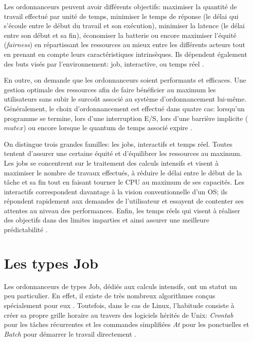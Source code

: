 \documentclass[letterpaper]{article}
\begin{document}
Les ordonnanceurs peuvent avoir différents objectifs: maximiser la quantité de travail effectué par unité de temps, minimiser le temps de réponse (le délai qui s'écoule entre le début du travail et son exécution), minimiser la latence (le délai entre son début et sa fin), économiser la batterie ou encore maximiser l'équité (\textit{fairness}) en répartissant les ressources au mieux entre les différents acteurs tout en prenant en compte leurs caractéristiques intrinsèques.
Ils dépendent également des buts visés par l'environnement: job, interactive, ou temps réel \citep{Hansen:1973:OSP:540365}.

En outre, on demande que les ordonnanceurs soient performants et efficaces. Une gestion optimale des ressources afin de faire bénéficier au maximum les utilisateurs sans subir le surcoût associé au système d'ordonnancement lui-même. Généralement, le choix d'ordonnancement est effectué dans quatre cas: lorsqu'un programme se termine, lors d'une interruption E/S, lors d'une barrière implicite ($mutex$) ou encore lorsque le quantum de temps associé expire \citep{Bovet:2005:ULK:1077084}.

On distingue trois grandes familles: les jobs, interactifs et temps réel. Toutes tentent d'assurer une certaine équité et d'équilibrer les ressources au maximum. Les jobs se concentrent sur le traitement des calculs intensifs et visent à maximiser le nombre de travaux effectués, à réduire le délai entre le début de la tâche et sa fin tout en faisant tourner le CPU au maximum de ses capacités. Les interactifs correspondent davantage à la vision conventionnelle d'un OS; ils répondent rapidement aux demandes de l'utilisateur et essayent de contenter ses attentes au niveau des performances. Enfin, les temps réels qui visent à réaliser des objectifs dans des limites imparties et ainsi assurer une meilleure prédictabilité \citep{Tanenbaum:2005:OSD:1076555}.

\section{Les types Job}

Les ordonnanceurs de types Job, dédiés aux calculs intensifs, ont un statut un peu particulier. En effet, il existe de très nombreux algorithmes conçus spécialement pour eux \citep{journals/cce/MendezCGHF06}. Toutefois, dans le cas de Linux, l'habitude consiste à créer sa propre grille horaire au travers des logiciels hérités de Unix: \textit{Crontab} pour les tâches récurrentes et les commandes simplifiées \textit{At} pour les ponctuelles et \textit{Batch} pour démarrer le travail directement \citep{x1994x}.
\end{document}
